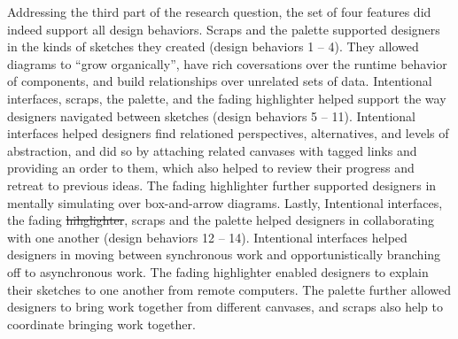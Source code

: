 \documentclass[12pt,fleqn]{ucithesis}
\providecommand{\DIFaddtex}[1]{{\protect\color{blue}\uwave{#1}}} %
\providecommand{\DIFdeltex}[1]{{\protect\color{red}\sout{#1}}}                      %
\providecommand{\DIFaddbegin}{} %
\providecommand{\DIFaddend}{} %
\providecommand{\DIFdelbegin}{} %
\providecommand{\DIFdelend}{} %
\providecommand{\DIFadd}[1]{\texorpdfstring{\DIFaddtex{#1}}{#1}} %
\providecommand{\DIFdel}[1]{\texorpdfstring{\DIFdeltex{#1}}{}} %
\begin{document}
Addressing the third part of the research question, the set of four features did indeed support all design behaviors. Scraps and the palette supported designers in the kinds of sketches they created (design behaviors 1 -- 4). They allowed diagrams to ``grow organically'', have rich coversations over the runtime behavior of components, and build relationships over unrelated sets of data. Intentional interfaces, scraps, the palette, and the fading highlighter helped support the way designers navigated between sketches (design behaviors 5 -- 11). Intentional interfaces helped designers find relationed perspectives, alternatives, and levels of abstraction, and did so by attaching related canvases with tagged links and providing an order to them, which also helped to review their progress and retreat to previous ideas. The fading highlighter further supported designers in mentally simulating over box-and-arrow diagrams. Lastly, Intentional interfaces, the fading \DIFdelbegin \DIFdel{hihglighter}\DIFdelend \DIFaddbegin \DIFadd{highlighter}\DIFaddend , scraps and the palette helped designers in collaborating with one another (design behaviors 12 -- 14). Intentional interfaces helped designers in moving between synchronous work and opportunistically branching off to asynchronous work. The fading highlighter enabled designers to explain their sketches to one another from remote computers. The palette further allowed designers to bring work together from different canvases, and scraps also help to coordinate bringing work together.





%
%
\end{document}
